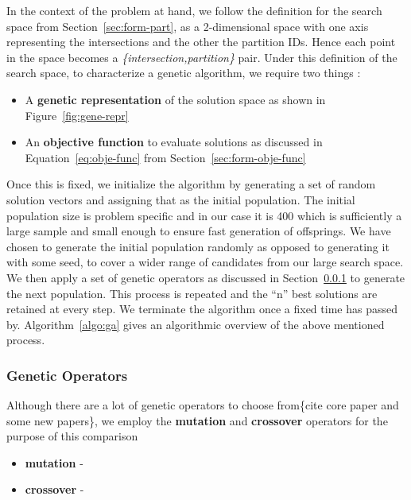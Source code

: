 In the context of the problem at hand, we follow the definition for the search space from Section~\ref{sec:form-part}, as a 2-dimensional space with one axis representing the intersections and the other the partition IDs. Hence each point in the space becomes a \textit{\{intersection,partition\}} pair. Under this definition of the search space, to characterize a genetic algorithm, we require two things :
\begin{itemize}
	\item A \textbf{genetic representation} of the solution space as shown in Figure~\ref{fig:gene-repr}
	\item An \textbf{objective function} to evaluate solutions as discussed in Equation~\ref{eq:obje-func} from Section~\ref{sec:form-obje-func}
\end{itemize}

Once this is fixed, we initialize the algorithm by generating a set of random solution vectors and assigning that as the initial population. The initial population size is problem specific and in our case it is 400 which is sufficiently a large sample and small enough to ensure fast generation of offsprings. We have chosen to generate the initial population randomly as opposed to generating it with some seed, to cover a wider range of candidates from our large search space. We then apply a set of genetic operators as discussed in Section~\ref{sec:gene-oper} to generate the next population. This process is repeated and the ``n'' best solutions are retained at every step. We terminate the algorithm once a fixed time has passed by. Algorithm~\ref{algo:ga} gives an algorithmic overview of the above mentioned process.

\subsubsection{Genetic Operators}
\label{sec:gene-oper}
Although there are a lot of genetic operators to choose from\{cite core paper and some new papers\}, we employ the \textbf{mutation} and \textbf{crossover} operators for the purpose of this comparison
\begin{itemize}
	\item \textbf{mutation} - 
	\item \textbf{crossover} - 
\end{itemize}